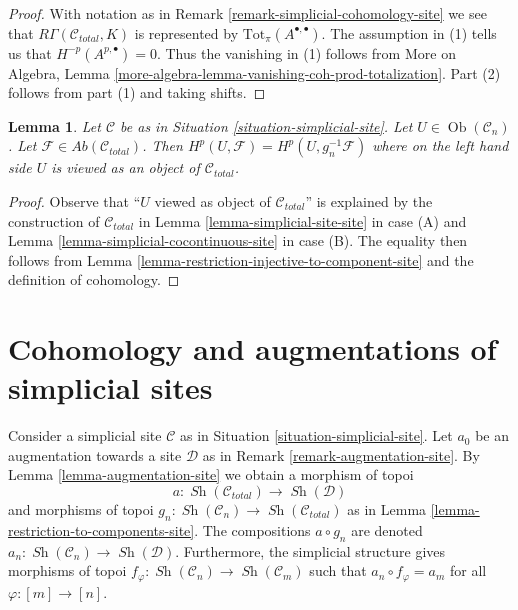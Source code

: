 \documentclass{stacks-project}
\theoremstyle{plain}
\newtheorem{lemma}[subsection]{Lemma}
\theoremstyle{definition}
\theoremstyle{remark}
\numberwithin{equation}{subsection}
\def\Ob{\mathop{\mathrm{Ob}}\nolimits}
\def\Sh{\mathop{\mathit{Sh}}\nolimits}
\begin{document}
\begin{proof}
With notation as in Remark \ref{remark-simplicial-cohomology-site}
we see that $R\Gamma(\mathcal{C}_{total}, K)$ is
represented by $\text{Tot}_\pi(A^{\bullet, \bullet})$.
The assumption in (1) tells us that $H^{-p}(A^{p, \bullet}) = 0$.
Thus the vanishing in (1) follows from
More on Algebra, Lemma \ref{more-algebra-lemma-vanishing-coh-prod-totalization}.
Part (2) follows from part (1) and taking shifts.
\end{proof}

\begin{lemma}
\label{lemma-sanity-check}
Let $\mathcal{C}$ be as in Situation \ref{situation-simplicial-site}.
Let $U \in \Ob(\mathcal{C}_n)$. Let
$\mathcal{F} \in \textit{Ab}(\mathcal{C}_{total})$.
Then $H^p(U, \mathcal{F}) = H^p(U, g_n^{-1}\mathcal{F})$
where on the left hand side $U$ is viewed as an object of $\mathcal{C}_{total}$.
\end{lemma}

\begin{proof}
Observe that ``$U$ viewed as object of $\mathcal{C}_{total}$''
is explained by the construction of $\mathcal{C}_{total}$ in
Lemma \ref{lemma-simplicial-site-site} in case (A) and
Lemma \ref{lemma-simplicial-cocontinuous-site} in case (B).
The equality then follows from
Lemma \ref{lemma-restriction-injective-to-component-site}
and the definition of cohomology.
\end{proof}






\section{Cohomology and augmentations of simplicial sites}
\label{section-cohomology-augmentation-simplicial-sites}

\noindent
Consider a simplicial site $\mathcal{C}$ as in
Situation \ref{situation-simplicial-site}.
Let $a_0$ be an augmentation towards a site $\mathcal{D}$ as in
Remark \ref{remark-augmentation-site}.
By Lemma \ref{lemma-augmentation-site} we obtain a morphism of topoi
$$
a : \Sh(\mathcal{C}_{total}) \longrightarrow \Sh(\mathcal{D})
$$
and morphisms of topoi
$g_n : \Sh(\mathcal{C}_n) \to \Sh(\mathcal{C}_{total})$
as in Lemma \ref{lemma-restriction-to-components-site}.
The compositions $a \circ g_n$ are denoted
$a_n : \Sh(\mathcal{C}_n) \to \Sh(\mathcal{D})$.
Furthermore, the simplicial structure gives
morphisms of topoi
$f_\varphi : \Sh(\mathcal{C}_n) \to \Sh(\mathcal{C}_m)$
such that $a_n \circ f_\varphi = a_m$ for all $\varphi : [m] \to [n]$.
\end{document}
